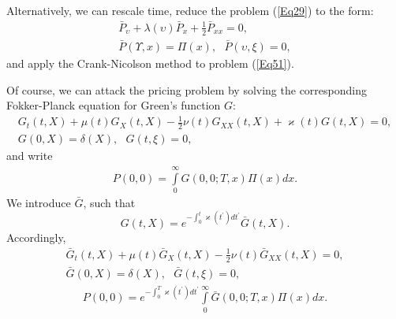 \documentclass{article}
\begin{document}
Alternatively, we can rescale time, reduce the problem (\ref{Eq29}) to the
form:%
\begin{equation}
\begin{array}{c}
\bar{P}_{\upsilon }+\lambda \left( \upsilon \right) \bar{P}_{x}+\frac{1}{2}%
\bar{P}_{xx}=0, \\ 
\bar{P}\left( \Upsilon ,x\right) =\Pi \left( x\right) ,\ \ \ \bar{P}%
(\upsilon ,\xi )=0,%
\end{array}
\label{Eq51}
\end{equation}%
and apply the Crank-Nicolson method to problem (\ref{Eq51}).

Of course, we can attack the pricing problem by solving the corresponding
Fokker-Planck equation for Green's function $G$:%
\begin{equation}
\begin{array}{c}
G_{t}(t,X)+\mu \left( t\right) G_{X}(t,X)-\frac{1}{2}\nu \left( t\right)
G_{XX}(t,X)+\varkappa \left( t\right) G(t,X)=0, \\ 
G\left( 0,X\right) =\delta \left( X\right) ,\ \ \ G(t,\xi )=0,%
\end{array}
\label{Eq52}
\end{equation}%
and write%
\begin{equation}
\begin{array}{c}
P\left( 0,0\right) =\int\limits_{0}^{\infty }G\left( 0,0;T,x\right) \Pi
\left( x\right) dx.%
\end{array}
\label{Eq53}
\end{equation}%
We introduce $\bar{G}$, such that%
\begin{equation}
G\left( t,X\right) =e^{-\int_{0}^{t}\varkappa \left( t^{\prime }\right)
dt^{\prime }}\bar{G}\left( t,X\right) .  \label{Eq53a}
\end{equation}%
Accordingly,%
\begin{equation}
\begin{array}{c}
\bar{G}_{t}(t,X)+\mu \left( t\right) \bar{G}_{X}(t,X)-\frac{1}{2}\nu \left(
t\right) \bar{G}_{XX}(t,X)=0, \\ 
\bar{G}\left( 0,X\right) =\delta \left( X\right) ,\ \ \ \bar{G}(t,\xi )=0,%
\end{array}
\label{Eq53b}
\end{equation}%
\begin{equation}
\begin{array}{c}
P\left( 0,0\right) =e^{-\int_{0}^{T}\varkappa \left( t^{\prime }\right)
dt^{\prime }}\int\limits_{0}^{\infty }\bar{G}\left( 0,0;T,x\right) \Pi
\left( x\right) dx.%
\end{array}%
\end{equation}%
\end{document}
